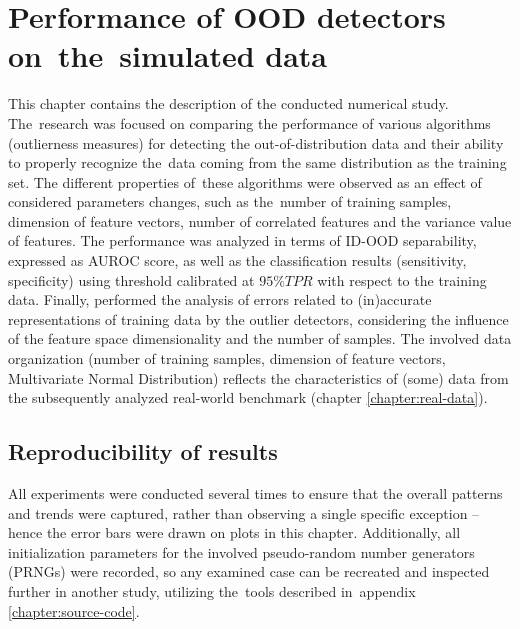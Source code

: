 \chapter{Performance of OOD detectors on~the~simulated data}
\label{chapter:simulations}

This chapter contains the description of the conducted numerical study. The~research was focused on comparing the performance of various algorithms (outlierness measures) for detecting the out-of-distribution data and their ability to properly recognize the~data coming from the same distribution as the training set. The different properties of~these algorithms were observed as an effect of considered parameters changes, such as the~number of training samples, dimension of feature vectors, number of correlated features and the variance value of features. The performance was analyzed in terms of ID-OOD separability, expressed as AUROC score, as well as the classification results (sensitivity, specificity) using threshold calibrated at $95\% TPR$ with respect to the training data. Finally, performed the analysis of errors related to (in)accurate representations of training data by the outlier detectors, considering the influence of the feature space dimensionality and the number of samples. The involved data organization (number of training samples, dimension of feature vectors, Multivariate Normal Distribution) reflects the characteristics of (some) data from the subsequently analyzed real-world benchmark (chapter \ref{chapter:real-data}).

\cleardoublepage{}









\section{Reproducibility of results}
\label{section:reproductibility}

All experiments were conducted several times to ensure that the overall patterns and trends were captured, rather than observing a single specific exception – hence the error bars were drawn on plots in this chapter. Additionally, all initialization parameters for the involved pseudo-random number generators (PRNGs) were recorded, so any examined case can be recreated and inspected further in another study, utilizing the~tools described in~appendix \ref{chapter:source-code}.
